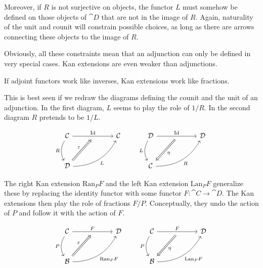 \documentclass[DaoFP]{subfiles}
\begin{document}
Moreover, if $R$ is not surjective on objects, the functor $L$ must somehow be defined on those objects of $\cat D$ that are not in the image of $R$. Again, naturality of the unit and counit will constrain possible choices, as long as there are arrows connecting these objects to the image of $R$. 

Obviously, all these constraints mean that an adjunction can only be defined in very special cases. Kan extensions are even weaker than adjunctions. 

If adjoint functors work like inverses, Kan extensions work like fractions. 

This is best seen if we redraw the diagrams defining the counit and the unit of an adjunction. In the first diagram, $L$ seems to play the role of $1/R$. In the second diagram $R$ pretends to be $1/L$.

\[
 \begin{tikzcd} [row sep=1cm, column sep=1cm]
 \cat C
 \arrow[rr, "\text{Id}", "" {name=ID, below} ]
 \arrow[d, bend right, "R"']
 && \cat C
 \\
 \cat D
  \arrow[urr, bend right, "L"']
 \arrow[Rightarrow, "\varepsilon",  to=ID]
 \end{tikzcd}
 \qquad
 \begin{tikzcd} [row sep=1cm, column sep=1cm]
 \cat D
 \arrow[rr, "\text{Id}", "" {name=ID, below} ]
 \arrow[d, bend right, "L"']
 && \cat D
 \\
 \cat C
  \arrow[urr, bend right, "R"']
 \arrow[Rightarrow, "\eta",  from=ID]
 \end{tikzcd}
\]

The right Kan extension $\text{Ran}_P F$ and the left Kan extension $\text{Lan}_P F$ generalize these by replacing the identity functor with some functor $F \colon \cat C \to \cat D$. The Kan extensions then play the role of fractions $F/P$. Conceptually, they undo the action of $P$ and follow it with the action of $F$.

\[
 \begin{tikzcd} [row sep=1cm, column sep=1cm]
 \cat C
 \arrow[rr, "F", "" {name=ID, below} ]
 \arrow[d, bend right, "P"']
 && \cat D
 \\
 \cat B
  \arrow[urr, bend right, "\text{Ran}_P F"']
 \arrow[Rightarrow, "\varepsilon",  to=ID]
 \end{tikzcd}
 \qquad
 \begin{tikzcd} [row sep=1cm, column sep=1cm]
 \cat C
 \arrow[rr, "F", "" {name=ID, below} ]
 \arrow[d, bend right, "P"']
 && \cat D
 \\
 \cat B
  \arrow[urr, bend right, "\text{Lan}_P F"']
 \arrow[Rightarrow, "\eta",  from=ID]
 \end{tikzcd}
\]
\end{document}
